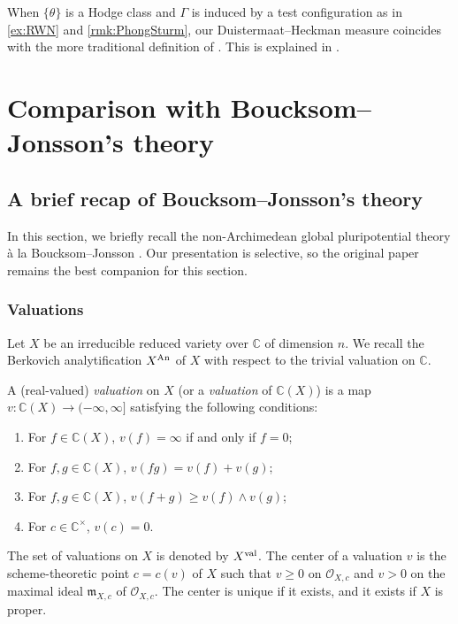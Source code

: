 \begin{remark}\label{rmk:NApotential:L862}
    When $\{\theta\}$ is a Hodge class and $\Gamma$ is induced by a test configuration as in \cref{ex:RWN} and \cref{rmk:PhongSturm}, our Duistermaat--Heckman measure coincides with the more traditional definition of \cite[Section~3.2]{BHJ17}. This is explained in \cite[Remark~7.17]{Xia21}.
\end{remark}

\section{Comparison with Boucksom--Jonsson's theory}\label{sec:compBJ}

\subsection{A brief recap of Boucksom--Jonsson's theory}
\label{subsec:BJ_recap}

In this section, we briefly recall the non-Archimedean global pluripotential theory à la Boucksom--Jonsson \cite{BJ22}. Our presentation is selective, so the original paper remains the best companion for this section.

\subsubsection{Valuations}
\label{subsubsec:BJ_val}

Let $X$ be an irreducible reduced variety over $\mathbb{C}$ of dimension $n$. We recall the Berkovich analytification $X^{\mathrm{An}}$ of $X$ with respect to the trivial valuation on $\mathbb{C}$.

\begin{definition}\label{def:NApotential:L878}
    A (real-valued) \emph{valuation} on $X$ (or a \emph{valuation} of $\mathbb{C}(X)$) is a map $v\colon \mathbb{C}(X)\rightarrow (-\infty,\infty]$ satisfying the following conditions:
\begin{enumerate}
    \item\label{itm:chapter-NApotential:L883:1} For $f\in \mathbb{C}(X)$, $v(f)=\infty$ if and only if $f=0$;
    \item\label{itm:chapter-NApotential:L883:2} For $f,g\in \mathbb{C}(X)$, $v(fg)=v(f)+v(g)$;
    \item\label{itm:chapter-NApotential:L883:3} For $f,g\in \mathbb{C}(X)$, $v(f+g)\geq v(f)\land v(g)$;
    \item\label{itm:chapter-NApotential:L883:4} For $c\in \mathbb{C}^{\times}$, $v(c)=0$.
\end{enumerate}
\end{definition}
The set of valuations on $X$ is denoted by $X^{\mathrm{val}}$. The center of a valuation $v$ is the scheme-theoretic point $c=c(v)$ of $X$ such that $v\geq 0$ on $\mathcal{O}_{X,c}$ and $v>0$ on the maximal ideal $\mathfrak{m}_{X,c}$ of $\mathcal{O}_{X,c}$. The center is unique if it exists, and it exists if $X$ is proper.

